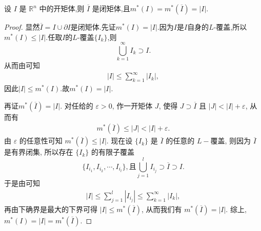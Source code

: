 \documentclass[../../main.tex]{subfiles}
\begin{document}
\begin{proposition}
设 \(I\) 是 \(\mathbb{R}^n\) 中的开矩体,则  \(\overline{I}\) 是闭矩体,且\(m^*(I) = m^*(\overline{I}) = |I|\). 
\end{proposition}
\begin{proof}
显然$\overline{I}=I\cup \partial I$是闭矩体.先证$m^*(I)=|I|$.因为$I$是$I$自身的$L$-覆盖,所以$m^*(I)\leqslant |I|$.任取$I$的$L$-覆盖$\{I_k\}$,则
\[
\bigcup_{k = 1}^{\infty} I_{k} \supset I.
\]
从而由可知
\begin{align*}
|I| \leqslant \sum_{k = 1}^{\infty} |I_k|,
\end{align*}
因此\(|I| \leqslant m^*(I)\).故$m^*(I)=|I|.$

再证$m^*(\overline{I})=|I|$.
对任给的 \(\varepsilon > 0\), 作一开矩体 \(J\), 使得 \(J \supset \overline{I}\) 且 \(|J| < |I| + \varepsilon\), 从而有
\begin{align*}
m^*(\overline{I}) \leqslant  |J| < |I| + \varepsilon.
\end{align*}
由 \(\varepsilon\) 的任意性可知 \(m^*(\overline{I}) \leqslant  |I|\). 现在设 \(\{I_k\}\) 是 \(\overline{I}\) 的任意的 \(L -\)覆盖, 则因为 \(\overline{I}\) 是有界闭集, 所以存在 \(\{I_k\}\) 的有限子覆盖
\[
\{I_{i_1}, I_{i_2}, \cdots, I_{i_l}\},\text{且}\bigcup_{j = 1}^l I_{i_j} \supset \overline{I}\supset I.
\]
于是由可知
\begin{align*}
|I| \leqslant  \sum_{j = 1}^l |I_{i_j}| \leqslant  \sum_{k = 1}^{\infty} |I_k|,
\end{align*}
再由下确界是最大的下界可得 \(|I| \leqslant  m^*(\overline{I})\), 从而我们有 \(m^*(\overline{I}) = |I|\). 
综上,$m^*(I)=|I|=m^*(\overline{I})$.

\end{proof}
\end{document}
